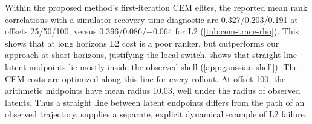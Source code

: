 \documentclass{article}
\theoremstyle{definition}
\theoremstyle{remark}
\begin{document}
Within the proposed method's first-iteration CEM elites, the reported mean rank correlations
with a simulator recovery-time diagnostic are 0.327/0.203/0.191 at offsets 25/50/100,
versus 0.396/0.086/$-0.064$ for L2 (\cref{tab:cem-trace-rho}). This shows that at long horizons L2 cost is a poor ranker, but outperforms our approach at short horizons, justifying the local switch.
 shows that straight-line latent midpoints lie mostly
inside the observed shell (\cref{app:gaussian-shell}). The CEM costs are optimized along this line for every rollout.
At offset 100, the arithmetic midpoints have mean radius 10.03, well under the radius of observed latents. Thus a straight line between latent
endpoints differs from the path of an observed trajectory.
 supplies a separate, explicit dynamical example of L2 failure.
\end{document}
